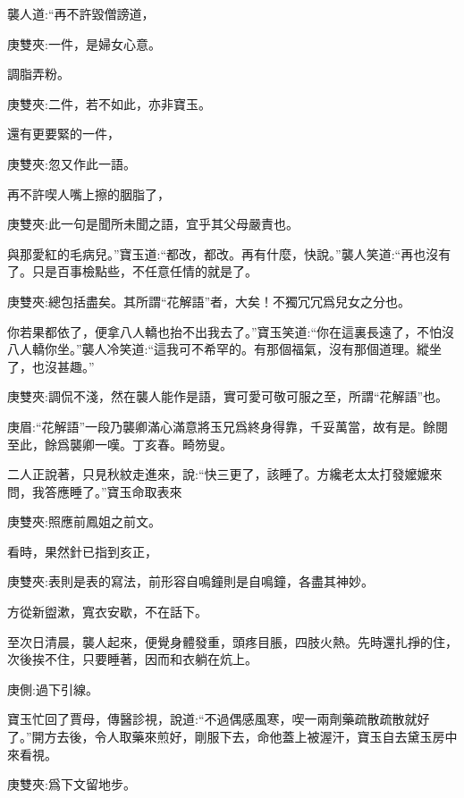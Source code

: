 \begin{parag}
    襲人道:“再不許毀僧謗道，\begin{note}庚雙夾:一件，是婦女心意。\end{note}調脂弄粉。\begin{note}庚雙夾:二件，若不如此，亦非寶玉。\end{note}還有更要緊的一件，\begin{note}庚雙夾:忽又作此一語。\end{note}再不許喫人嘴上擦的胭脂了，\begin{note}庚雙夾:此一句是聞所未聞之語，宜乎其父母嚴責也。\end{note}與那愛紅的毛病兒。”寶玉道:“都改，都改。再有什麼，快說。”襲人笑道:“再也沒有了。只是百事檢點些，不任意任情的就是了。\begin{note}庚雙夾:總包括盡矣。其所謂“花解語”者，大矣！不獨冗冗爲兒女之分也。\end{note}你若果都依了，便拿八人轎也抬不出我去了。”寶玉笑道:“你在這裏長遠了，不怕沒八人轎你坐。”襲人冷笑道:“這我可不希罕的。有那個福氣，沒有那個道理。縱坐了，也沒甚趣。”\begin{note}庚雙夾:調侃不淺，然在襲人能作是語，實可愛可敬可服之至，所謂“花解語”也。\end{note}\begin{note}庚眉:“花解語”一段乃襲卿滿心滿意將玉兄爲終身得靠，千妥萬當，故有是。餘閱至此，餘爲襲卿一嘆。丁亥春。畸笏叟。\end{note}
\end{parag}


\begin{parag}
    二人正說著，只見秋紋走進來，說:“快三更了，該睡了。方纔老太太打發嬤嬤來問，我答應睡了。”寶玉命取表來\begin{note}庚雙夾:照應前鳳姐之前文。\end{note}看時，果然針已指到亥正，\begin{note}庚雙夾:表則是表的寫法，前形容自鳴鐘則是自鳴鐘，各盡其神妙。\end{note}方從新盥漱，寬衣安歇，不在話下。
\end{parag}


\begin{parag}
    至次日清晨，襲人起來，便覺身體發重，頭疼目脹，四肢火熱。先時還扎掙的住，次後挨不住，只要睡著，因而和衣躺在炕上。\begin{note}庚側:過下引線。\end{note}寶玉忙回了賈母，傳醫診視，說道:“不過偶感風寒，喫一兩劑藥疏散疏散就好了。”開方去後，令人取藥來煎好，剛服下去，命他蓋上被渥汗，寶玉自去黛玉房中來看視。\begin{note}庚雙夾:爲下文留地步。\end{note}
\end{parag}


